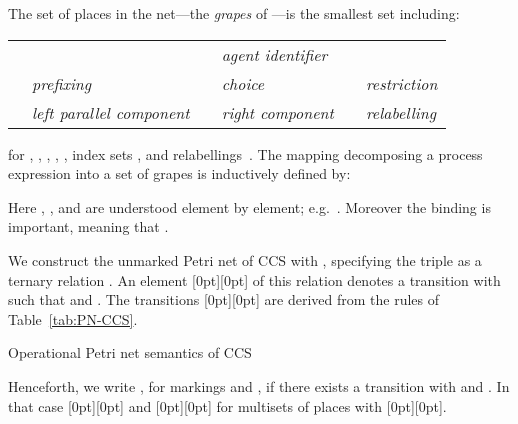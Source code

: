 \documentclass[smallcondensed]{svjour3}
\newcommand{\plat}[1]{\raisebox{0pt}[0pt][0pt]{#1}}  \def\precond#1{{\vphantom{#1}}^\bullet #1}
\newcommand{\Tab}[1]{Table~\ref{tab:#1}}
\begin{document}
The set  of places in the net---the \emph{grapes} of \cite{DDM87}---is the smallest set including:
\vspace{-12pt}
\begin{center}
\begin{tabular}{@{}l@{~~}l@{\qquad}l@{~~}l@{\qquad}l@{~~}l@{}}
&& &  \emph{agent identifier}\\
  & \emph{prefixing}&
  & \emph{choice}&
  & \emph{restriction}\\
 & \emph{left parallel component}&
 & \emph{right component} &
 &  \emph{relabelling} \\
\end{tabular}
\end{center}
\noindent for , ,
 , , , index sets , and relabellings~.
The mapping  decomposing
a process expression into a set of grapes is inductively defined by:

Here , ,  and  are understood element by element; e.g.\
. Moreover the binding is important, meaning that .

We construct the unmarked Petri net  of CCS
with , specifying the triple  as a ternary relation
.
An element \plat{} of this relation denotes a transition  with 
such that  and .
The transitions \plat{} are derived from the rules of \Tab{PN-CCS}.
\begin{table}[ht]
\normalsize
\begin{center}
\framebox{}
\end{center}
\caption{Operational Petri net semantics of CCS}
\label{tab:PN-CCS}
\end{table}

Henceforth, we write , for markings  and
, if there exists a transition  with  and .
In that case \plat{} and \plat{} for multisets of places  with \plat{}.
\end{document}
